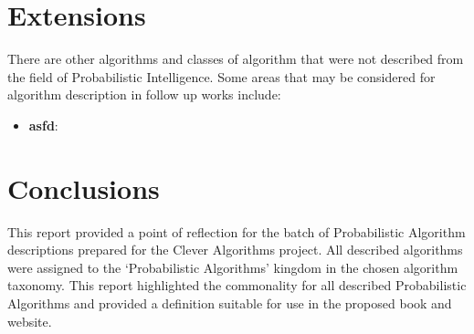 \documentclass[a4paper, 11pt]{article}
\begin{document}
% 
% 
\section{Extensions}
\label{sec:extensions}
There are other algorithms and classes of algorithm that were not described from the field of Probabilistic Intelligence. Some areas that may be considered for algorithm description in follow up works include:

\begin{itemize}
	\item \textbf{asfd}:
\end{itemize}

% 
% 
\section{Conclusions}
\label{sec:conclusions}
This report provided a point of reflection for the batch of Probabilistic Algorithm descriptions prepared for the Clever Algorithms project. All described algorithms were assigned to the `Probabilistic Algorithms' kingdom in the chosen algorithm taxonomy. This report highlighted the commonality for all described Probabilistic Algorithms and provided a definition suitable for use in the proposed book and website.



\end{document}
